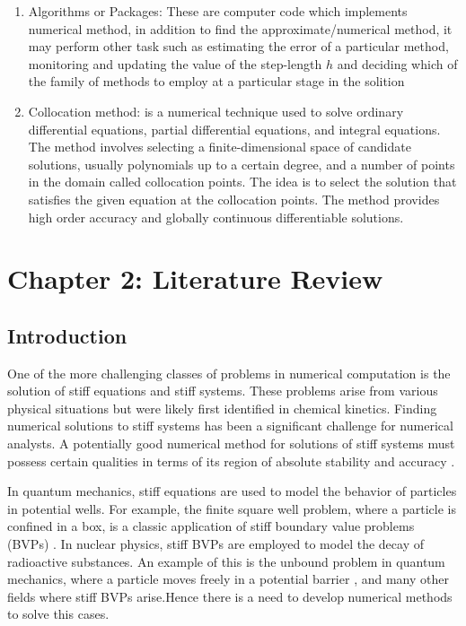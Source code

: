 \documentclass{report}
\begin{document}
\begin{enumerate}
  \item Algorithms or Packages: These are computer code which implements numerical method, in addition to find the approximate/numerical method, it may perform other task such as estimating the error of a particular method, monitoring and updating the value of the step-length $h$ and deciding which of the family of methods to employ at a particular stage in the solition \cite{lambert1977} 

  \item Collocation method:  is a numerical technique used to solve ordinary differential equations, partial differential equations, and integral equations. The method involves selecting a finite-dimensional space of candidate solutions, usually polynomials up to a certain degree, and a number of points in the domain called collocation points. The idea is to select the solution that satisfies the given equation at the collocation points. The method provides high order accuracy and globally continuous differentiable solutions. \cite{enwiki:1166346639}
\end{enumerate}
\newpage
\section{Chapter 2: Literature Review}

\subsection{Introduction}
One of the more challenging classes of problems in numerical computation is the solution of stiff equations and stiff systems. These problems arise from various physical situations but were likely first identified in chemical kinetics. Finding numerical solutions to stiff systems has been a significant challenge for numerical analysts. A potentially good numerical method for solutions of stiff systems must possess certain qualities in terms of its region of absolute stability and accuracy \cite{QURESH2024}.

In quantum mechanics, stiff equations are used to model the behavior of particles in potential wells. For example, the finite square well problem, where a particle is confined in a box, is a classic application of stiff boundary value problems (BVPs) \cite{cappellaro:bound-problems}. In nuclear physics, stiff BVPs are employed to model the decay of radioactive substances. An example of this is the unbound problem in quantum mechanics, where a particle moves freely in a potential barrier \cite{cappellaro:unbound-problems}, and many other fields where stiff BVPs arise.Hence there is a need to develop numerical methods to solve this cases.
\end{document}
